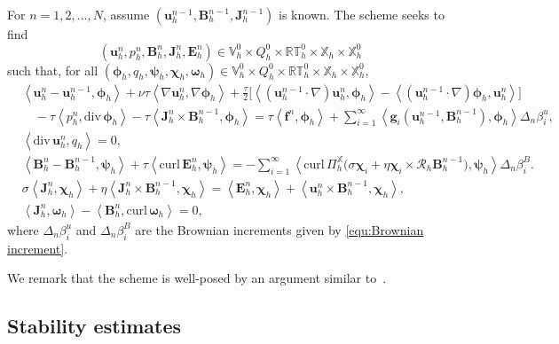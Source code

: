 \documentclass[11pt, reqno]{amsart}
\theoremstyle{definition}
\numberwithin{equation}{section}
\newcommand{\curl}{\mathrm{curl}\,}
\newcommand{\divg}{\mathrm{div}\,}
\newcommand{\bff}{\boldsymbol}
\newcommand{\bb}{\mathbb}
\newcommand{\inpro}[2]{\left\langle#1,#2\right\rangle}
\begin{document}
For $n=1,2,\ldots,N$, assume $(\bff{u}_h^{n-1},\bff{B}_h^{n-1},\bff{J}_h^{n-1})$ is known. The scheme seeks to find
\[
(\bff{u}_h^n,p_h^n,\bff{B}_h^n,\bff{J}_h^n,\bff{E}_h^n)\in \bb{V}_h^0\times Q_h^0\times\bb{RT}_h^0\times\bb{X}_h\times\bb{X}_h^0
\]
such that, for all $(\bff{\phi}_h,q_h,\bff{\psi}_h,\bff{\chi}_h,\bff{\omega}_h)\in \bb{V}_h^0\times Q_h^0\times\bb{RT}_h^0\times\bb{X}_h\times\bb{X}_h^0$,
\begin{subequations}\label{equ:stoch fem}
	\begin{align}
		&\inpro{\bff{u}_h^n-\bff{u}_h^{n-1}}{\bff{\phi}_h}
		+\nu\tau\inpro{\nabla\bff{u}_h^n}{\nabla\bff{\phi}_h}
		+\frac{\tau}{2}\Big[\inpro{(\bff{u}_h^{n-1}\cdot\nabla)\bff{u}_h^n}{\bff{\phi}_h}-\inpro{(\bff{u}_h^{n-1}\cdot\nabla)\bff{\phi}_h}{\bff{u}_h^n}\Big]
		\nonumber\\
		&\quad
		-\tau\inpro{p_h^n}{\divg\bff{\phi}_h}
		-\tau\inpro{\bff{J}_h^n\times\bff{B}_h^{n-1}}{\bff{\phi}_h}
		=
		\tau\inpro{\bff{f}^n}{\bff{\phi}_h}
		+\sum_{i=1}^\infty\inpro{\bff{g}_i(\bff{u}_h^{n-1},\bff{B}_h^{n-1})}{\bff{\phi}_h}\Delta_n\beta_i^u,
		\label{equ:stoch fem u}
		\\[1ex]
		&\inpro{\divg\bff{u}_h^n}{q_h}=0,
		\label{equ:stoch fem div u}
		\\[1ex]
		&\inpro{\bff{B}_h^n-\bff{B}_h^{n-1}}{\bff{\psi}_h}
		+\tau\inpro{\curl\bff{E}_h^n}{\bff{\psi}_h}
		=
		-\sum_{i=1}^{\infty}
		\inpro{\curl \Pi_h^{\bb{X}}\bigl(\sigma\bff{\chi}_i+\eta\bff{\chi}_i\times\mathcal{R}_h\bff{B}_h^{n-1}\bigr)}{\bff{\psi}_h}\Delta_n\beta_i^B.
		\label{equ:stoch fem B}
		\\[1ex]
		&\sigma\inpro{\bff{J}_h^n}{\bff{\chi}_h}
		+\eta\inpro{\bff{J}_h^n\times\bff{B}_h^{n-1}}{\bff{\chi}_h}
		=
		\inpro{\bff{E}_h^n}{\bff{\chi}_h}
		+\inpro{\bff{u}_h^n\times\bff{B}_h^{n-1}}{\bff{\chi}_h},
		\label{equ:stoch fem Ohm}
		\\[1ex]
		&\inpro{\bff{J}_h^n}{\bff{\omega}_h}
		-\inpro{\bff{B}_h^n}{\curl\bff{\omega}_h}=0,
		\label{equ:stoch fem J}
	\end{align}
\end{subequations}
where $\Delta_n\beta_i^u$ and $\Delta_n\beta_i^B$ are the Brownian increments given by \eqref{equ:Brownian increment}.

We remark that the scheme is well-posed by an argument similar to~\cite{GolSoeTra26}.


\subsection{Stability estimates}
\label{subsec:stoch stability estimates}
\end{document}

